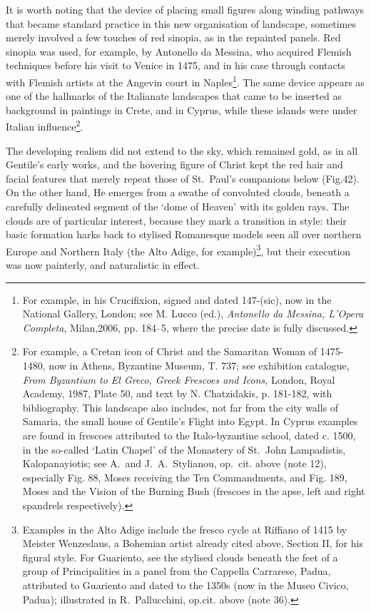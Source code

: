 \documentclass[a4paper,12pt]{article}
\begin{document}
It is worth noting that the device of placing small figures along
winding pathways that became standard practice in this new
organisation of landscape, sometimes merely involved a few touches of
red sinopia, as in the repainted panels.  Red sinopia was used, for
example, by Antonello da Messina, who acquired Flemish techniques
before his visit to Venice in 1475, and in his case through contacts
with Flemish artists at the Angevin court in Naples\footnote{For
example, in his Crucifixion, signed and dated 147-(sic), now in the
National Gallery, London; see M. Lucco (ed.), \textit{Antonello da
Messina, L'Opera Completa}, Milan,2006, pp. 184--5, where the precise
date is fully discussed.
}. The same device appears as one of the hallmarks of the Italianate
landscapes that came to be inserted as background in paintings in
Crete, and in Cyprus, while these islands were under Italian
influence\footnote{For example, a Cretan icon of Christ and the
Samaritan Woman of 1475-1480, now in Athens, Byzantine Museum, T. 737;
see exhibition catalogue, \textit{From Byzantium to El Greco, Greek
Frescoes and Icons}, London, Royal Academy, 1987, Plate 50, and text
by N. Chatzidakis, p. 181-182, with bibliography. This landscape also
includes, not far from the city walls of Samaria, the small house of
Gentile's Flight into Egypt. In Cyprus examples are found in frescoes
attributed to the Italo-byzantine school, dated c. 1500, in the
so-called `Latin Chapel' of the Monastery of St.~John Lampadistis,
Kalopanayiotis; see A.~and J.~A.~Stylianou, op.~cit. above (note 12),
especially Fig. 88, Moses receiving the Ten Commandments, and
Fig. 189, Moses and the Vision of the Burning Bush (frescoes in the
apse, left and right spandrels respectively).}.

The developing realism did not extend to the sky, which remained gold,
as in all Gentile's early works, and the hovering figure of Christ
kept the red hair and facial features that merely repeat those of
St.~Paul's companions below (Fig.42). On the other hand, He emerges
from a swathe of convoluted clouds, beneath a carefully delineated
segment of the `dome of Heaven' with its golden rays. The clouds are
of particular interest, because they mark a transition in style: their
basic formation harks back to stylised Romanesque models seen all over
northern Europe and Northern Italy (the Alto Adige, for
example)\footnote{Examples in the Alto Adige include the fresco cycle
at Riffiano of 1415 by Meister Wenzeslaus, a Bohemian artist already
cited above, Section II, for his figural style. For Guariento, see the
stylised clouds beneath the feet of a group of Principalities in a
panel from the Cappella Carrarese, Padua, attributed to Guariento and
dated to the 1350s (now in the Museo Civico, Padua); illustrated in
R.~Pallucchini, op.cit. above (note 36).}, but their execution was now
painterly, and naturalistic in effect.
\end{document}
